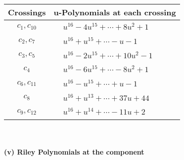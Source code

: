 \documentclass[1p]{elsarticle_modified}
\theoremstyle{definition}
\begin{document}
\begin{tabular}{m{50pt}|m{274pt}}
Crossings & \hspace{64pt}u-Polynomials at each crossing \\
\hline $$\begin{aligned}c_{1},c_{10}\end{aligned}$$&$\begin{aligned}
&u^{16}-4 u^{15}+\cdots+8 u^2+1
\end{aligned}$\\
\hline $$\begin{aligned}c_{2},c_{7}\end{aligned}$$&$\begin{aligned}
&u^{16}+u^{15}+\cdots- u-1
\end{aligned}$\\
\hline $$\begin{aligned}c_{3},c_{5}\end{aligned}$$&$\begin{aligned}
&u^{16}-2 u^{15}+\cdots+10 u^2-1
\end{aligned}$\\
\hline $$\begin{aligned}c_{4}\end{aligned}$$&$\begin{aligned}
&u^{16}-6 u^{15}+\cdots-8 u^2+1
\end{aligned}$\\
\hline $$\begin{aligned}c_{6},c_{11}\end{aligned}$$&$\begin{aligned}
&u^{16}- u^{15}+\cdots+u-1
\end{aligned}$\\
\hline $$\begin{aligned}c_{8}\end{aligned}$$&$\begin{aligned}
&u^{16}+u^{13}+\cdots+37 u+44
\end{aligned}$\\
\hline $$\begin{aligned}c_{9},c_{12}\end{aligned}$$&$\begin{aligned}
&u^{16}+u^{14}+\cdots-11 u+2
\end{aligned}$\\
\hline
\end{tabular}\\~\\
\newpage\renewcommand{\arraystretch}{1}
\flushleft \textbf{(v) Riley Polynomials at the component}\newline \\
\end{document}
